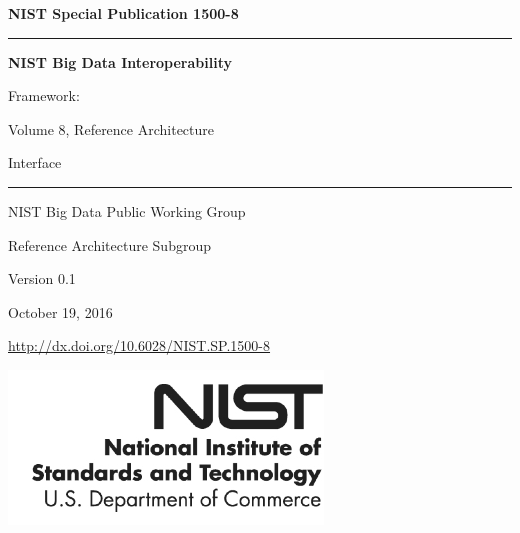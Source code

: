 \documentclass[11pt]{article}
\begin{document}
\newpage
\listoftodos[Notes]

\begin{flushright}
{\Large\bf NIST Special Publication 1500-8} 

\bigskip\bigskip

\hrule
\bigskip\bigskip

{\Huge\bf\sf
NIST Big Data Interoperability 

Framework:

Volume 8, Reference Architecture 

Interface
}


\bigskip\bigskip
\hrule

\vspace{2cm}

{\large

NIST Big Data Public Working Group

Reference Architecture Subgroup

\vspace{2cm}

Version 0.1

October 19, 2016

\bigskip
\url{http://dx.doi.org/10.6028/NIST.SP.1500-8}

}
\vspace{2cm}

\vfill

\begin{flushright}
\includegraphics{images/nist.png}
\end{flushright}

\end{flushright}

\newpage
\end{document}
